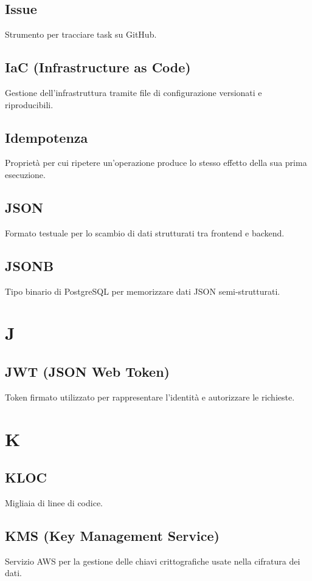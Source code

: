 \documentclass[a4paper,12pt]{article}
\begin{document}
\subsection{Issue}
Strumento per tracciare task su GitHub.

\subsection{IaC (Infrastructure as Code)}
Gestione dell'infrastruttura tramite file di configurazione versionati e riproducibili.

\subsection{Idempotenza}
Proprietà per cui ripetere un'operazione produce lo stesso effetto della sua prima esecuzione.

\subsection{JSON}
Formato testuale per lo scambio di dati strutturati tra frontend e backend.

\subsection{JSONB}
Tipo binario di PostgreSQL per memorizzare dati JSON semi-strutturati.

\section{J}
\subsection{JWT (JSON Web Token)}
Token firmato utilizzato per rappresentare l'identità e autorizzare le richieste.

\section{K}
\subsection{KLOC}
Migliaia di linee di codice.

\subsection{KMS (Key Management Service)}
Servizio AWS per la gestione delle chiavi crittografiche usate nella cifratura dei dati.
\end{document}
